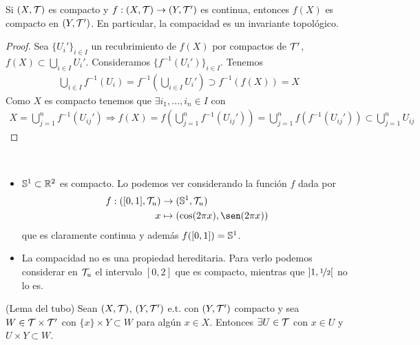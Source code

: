 \begin{prop}
    Si $(X, \mathcal{T})$ es compacto y $f:(X, \mathcal{T})\to (Y, \mathcal{T}')$ es continua, entonces $f(X)$ es compacto en $(Y, \mathcal{T}')$. En particular, la compacidad es un invariante topológico.\\

    
    \begin{proof}
        Sea $\{U_i'\}_{i\in I}$ un recubrimiento de $f(X)$ por compactos de $\mathcal{T}'$, $f(X)\subset \bigcup\limits_{i\in I}U_i'$. Consideramos $\{f^{-1}(U_i')\}_{i\in I}$. Tenemos 
        \begin{align*}
            \bigcup\limits_{i\in I}f^{-1}(U_i) = f^{-1}\left(\bigcup\limits_{i\in I} U_i'\right) \supset f^{-1}(f(X)) = X
        \end{align*}
        Como $X$ es compacto tenemos que $\exists i_1, \dots, i_n \in I$ con
        \begin{align*}
            X = \bigcup\limits_{j=1}^n f^{-1}(U_{ij}') \Rightarrow f(X)=f\left(\bigcup\limits_{j=1}^n f^{-1}(U_{ij}')\right) = \bigcup\limits_{j=1}^n f(f^{-1}(U_{ij}')) \subset \bigcup\limits_{j=1}^n U_{ij}
        \end{align*}

    \end{proof}
\end{prop}

\begin{ejemplo}\
    \begin{itemize}
        \item $\mathbb{S}^1\subset \mathbb{R}^2$ es compacto. Lo podemos ver considerando la función $f$ dada por 
        \begin{align*}
            f:([0,1], \cc{T}_u)&\to (\bb{S}^1, \cc{T}_u)\\
            x&\mapsto (\cos(2\pi x), \sen(2\pi x))
        \end{align*}
        que es claramente continua y además $f([0,1])=\mathbb{S}^1$.
        \item La compacidad no es una propiedad hereditaria. Para verlo podemos considerar en $\mathcal{T}_u$ el intervalo $[0,2]$ que es compacto, mientras que $]1,\nicefrac{1}{2}[$ no lo es.
    \end{itemize}
    \endsquare
\end{ejemplo}

\begin{lema}
    (Lema del tubo) Sean $(X, \mathcal{T})$, $(Y, \mathcal{T}')$ e.t. con $(Y, \mathcal{T}')$ compacto y sea $W\in \mathcal{T}\times \mathcal{T}'$ con $\{x\}\times Y \subset W$ para algún $x\in X$. Entonces $\exists U\in \mathcal{T}$ con $x\in U$ y $U\times Y \subset W$.
    \endsquare
\end{lema}

